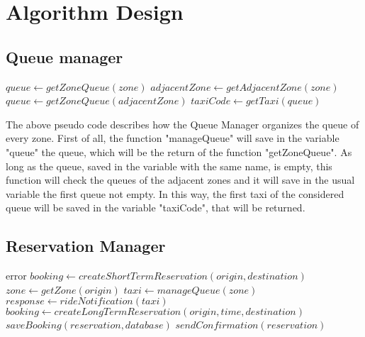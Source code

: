 \section{Algorithm Design}
\subsection{Queue manager}
\begin{algorithmic}
		\State $queue\gets getZoneQueue(zone)$
				\State $adjacentZone \gets getAdjacentZone(zone)$
				\State $queue\gets getZoneQueue(adjacentZone)$
		\EndWhile
		\State $taxiCode \gets getTaxi(queue)$
		\State {}
	\EndFunction
\end{algorithmic}


\vspace{0.5cm}

The above pseudo code describes how the Queue Manager organizes the queue of every zone. 
First of all, the function "manageQueue" will save in the variable "queue" the queue, which will be the return of the function "getZoneQueue". 
As long as the queue, saved in the variable with the same name, is empty, this function will check the queues of the adjacent zones and it will save in the usual variable the first queue not empty.
In this way, the first taxi of the considered queue will be saved in the variable "taxiCode", that will be returned.

\newpage
\subsection{Reservation Manager}
\begin{algorithmic}
			\State \Return error 
		\EndIf
			\State $booking \gets createShortTermReservation(origin, destination)$
			\State $zone \gets getZone(origin)$
				\State $taxi \gets manageQueue(zone)$
				\State $response \gets rideNotification(taxi)$
			\EndWhile	
		\Else 
			\State $booking \gets createLongTermReservation(origin, time, destination)$
			\State $saveBooking(reservation, database)$
			\State \Return
		\EndIf
		\State $sendConfirmation(reservation)$
		\State \Return
	\EndFunction
\end{algorithmic}

